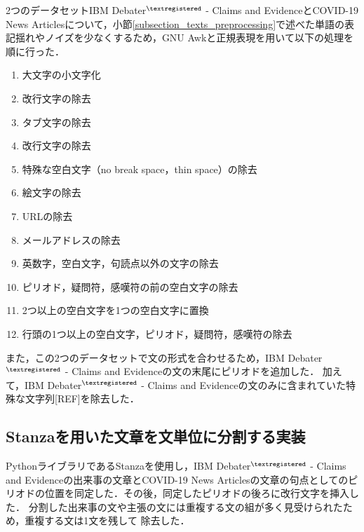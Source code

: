 \documentclass[12pt,a4j]{jreport}
\begin{document}
2つのデータセットIBM Debater$^{\textregistered}$ - Claims and EvidenceとCOVID-19 News Articlesについて，小節\ref{subsection_texts_preprocessing}で述べた単語の表記揺れやノイズを少なくするため，GNU Awkと正規表現を用いて以下の処理を順に行った．

\begin{multicols}{2}
  \begin{enumerate}
  \item 大文字の小文字化
  \item 改行文字の除去
  \item タブ文字の除去
  \item 改行文字の除去
  \item 特殊な空白文字（no break space，thin space）の除去
  \item 絵文字の除去
  \columnbreak
  \item URLの除去
  \item メールアドレスの除去
  \item 英数字，空白文字，句読点以外の文字の除去
  \item ピリオド，疑問符，感嘆符の前の空白文字の除去
  \item 2つ以上の空白文字を1つの空白文字に置換
  \item 行頭の1つ以上の空白文字，ピリオド，疑問符，感嘆符の除去
  \end{enumerate}
\end{multicols}

また，この2つのデータセットで文の形式を合わせるため，IBM Debater$^{\textregistered}$ - Claims and Evidenceの文の末尾にピリオドを追加した．
加えて，IBM Debater$^{\textregistered}$ - Claims and Evidenceの文のみに含まれていた特殊な文字列[REF]を除去した．


\subsection{Stanzaを用いた文章を文単位に分割する実装}
PythonライブラリであるStanzaを使用し，IBM Debater$^{\textregistered}$ - Claims and Evidenceの出来事の文章とCOVID-19 News Articlesの文章の句点としてのピリオドの位置を同定した．その後，同定したピリオドの後ろに改行文字を挿入した．
分割した出来事の文や主張の文には重複する文の組が多く見受けられたため，重複する文は1文を残して
除去した．
\end{document}
